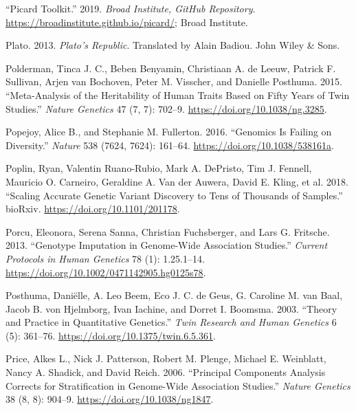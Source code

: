 \documentclass[
]{book}
\newlength{\cslhangindent}
\newlength{\cslentryspacingunit} %
\newenvironment{CSLReferences}[2] %
 {%
  \setlength{\parindent}{0pt}
  \ifodd #1
  \let\oldpar\par
  \def\par{\hangindent=\cslhangindent\oldpar}
  \fi
  \setlength{\parskip}{#2\cslentryspacingunit}
 }%
 {}
\begin{document}
\begin{CSLReferences}{1}{0}
\leavevmode{}%
{``Picard Toolkit.''} 2019. \emph{Broad Institute, GitHub Repository}. \url{https://broadinstitute.github.io/picard/}; Broad Institute.

\leavevmode{}%
Plato. 2013. \emph{Plato's {Republic}}. Translated by Alain Badiou. {John Wiley \& Sons}.

\leavevmode{}%
Polderman, Tinca J. C., Beben Benyamin, Christiaan A. de Leeuw, Patrick F. Sullivan, Arjen van Bochoven, Peter M. Visscher, and Danielle Posthuma. 2015. {``Meta-Analysis of the Heritability of Human Traits Based on Fifty Years of Twin Studies.''} \emph{Nature Genetics} 47 (7, 7): 702--9. \url{https://doi.org/10.1038/ng.3285}.

\leavevmode{}%
Popejoy, Alice B., and Stephanie M. Fullerton. 2016. {``Genomics Is Failing on Diversity.''} \emph{Nature} 538 (7624, 7624): 161--64. \url{https://doi.org/10.1038/538161a}.

\leavevmode{}%
Poplin, Ryan, Valentin Ruano-Rubio, Mark A. DePristo, Tim J. Fennell, Mauricio O. Carneiro, Geraldine A. Van der Auwera, David E. Kling, et al. 2018. {``Scaling Accurate Genetic Variant Discovery to Tens of Thousands of Samples.''} {bioRxiv}. \url{https://doi.org/10.1101/201178}.

\leavevmode{}%
Porcu, Eleonora, Serena Sanna, Christian Fuchsberger, and Lars G. Fritsche. 2013. {``Genotype {Imputation} in {Genome-Wide Association Studies}.''} \emph{Current Protocols in Human Genetics} 78 (1): 1.25.1--14. \url{https://doi.org/10.1002/0471142905.hg0125s78}.

\leavevmode{}%
Posthuma, Daniëlle, A. Leo Beem, Eco J. C. de Geus, G. Caroline M. van Baal, Jacob B. von Hjelmborg, Ivan Iachine, and Dorret I. Boomsma. 2003. {``Theory and {Practice} in {Quantitative Genetics}.''} \emph{Twin Research and Human Genetics} 6 (5): 361--76. \url{https://doi.org/10.1375/twin.6.5.361}.

\leavevmode{}%
Price, Alkes L., Nick J. Patterson, Robert M. Plenge, Michael E. Weinblatt, Nancy A. Shadick, and David Reich. 2006. {``Principal Components Analysis Corrects for Stratification in Genome-Wide Association Studies.''} \emph{Nature Genetics} 38 (8, 8): 904--9. \url{https://doi.org/10.1038/ng1847}.


\end{CSLReferences}
\end{document}
